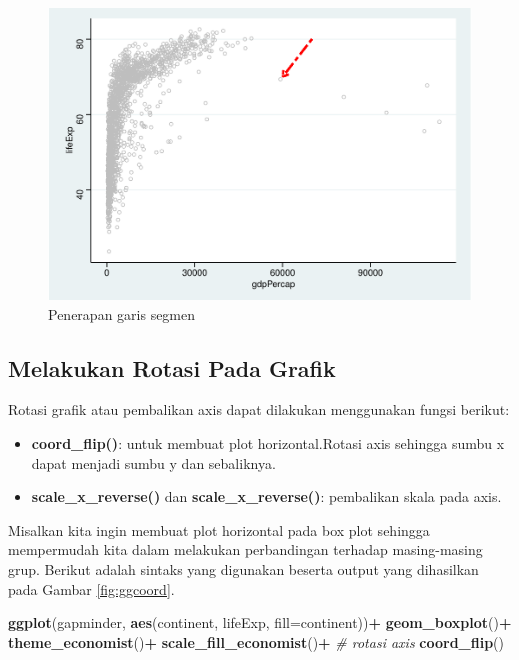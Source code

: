 \documentclass[]{book}
\newenvironment{Shaded}{\begin{snugshade}}{\end{snugshade}}
\newcommand{\KeywordTok}[1]{\textcolor[rgb]{0.13,0.29,0.53}{\textbf{#1}}}
\newcommand{\DataTypeTok}[1]{\textcolor[rgb]{0.13,0.29,0.53}{#1}}
\newcommand{\StringTok}[1]{\textcolor[rgb]{0.31,0.60,0.02}{#1}}
\newcommand{\CommentTok}[1]{\textcolor[rgb]{0.56,0.35,0.01}{\textit{#1}}}
\newcommand{\OperatorTok}[1]{\textcolor[rgb]{0.81,0.36,0.00}{\textbf{#1}}}
\newcommand{\NormalTok}[1]{#1}
\providecommand{\tightlist}{%
  \setlength{\itemsep}{0pt}\setlength{\parskip}{0pt}}
\begin{document}
\begin{figure}

{\centering \includegraphics[width=0.7\linewidth]{EnvStat_files/figure-latex/ggsegment-1} 

}

\caption{Penerapan garis segmen}\label{fig:ggsegment}
\end{figure}

\subsection{Melakukan Rotasi Pada
Grafik}\label{melakukan-rotasi-pada-grafik}

Rotasi grafik atau pembalikan axis dapat dilakukan menggunakan fungsi
berikut:

\begin{itemize}
\tightlist
\item
  \textbf{coord\_flip()}: untuk membuat plot horizontal.Rotasi axis
  sehingga sumbu x dapat menjadi sumbu y dan sebaliknya.
\item
  \textbf{scale\_x\_reverse()} dan \textbf{scale\_x\_reverse()}:
  pembalikan skala pada axis.
\end{itemize}

Misalkan kita ingin membuat plot horizontal pada box plot sehingga
mempermudah kita dalam melakukan perbandingan terhadap masing-masing
grup. Berikut adalah sintaks yang digunakan beserta output yang
dihasilkan pada Gambar \ref{fig:ggcoord}.

\begin{Shaded}
\begin{Highlighting}[]
\KeywordTok{ggplot}\NormalTok{(gapminder, }\KeywordTok{aes}\NormalTok{(continent, lifeExp, }
                      \DataTypeTok{fill=}\NormalTok{continent))}\OperatorTok{+}
\StringTok{  }\KeywordTok{geom_boxplot}\NormalTok{()}\OperatorTok{+}
\StringTok{  }\KeywordTok{theme_economist}\NormalTok{()}\OperatorTok{+}
\StringTok{  }\KeywordTok{scale_fill_economist}\NormalTok{()}\OperatorTok{+}
\StringTok{  }\CommentTok{# rotasi axis}
\StringTok{  }\KeywordTok{coord_flip}\NormalTok{()}
\end{Highlighting}
\end{Shaded}
\end{document}
